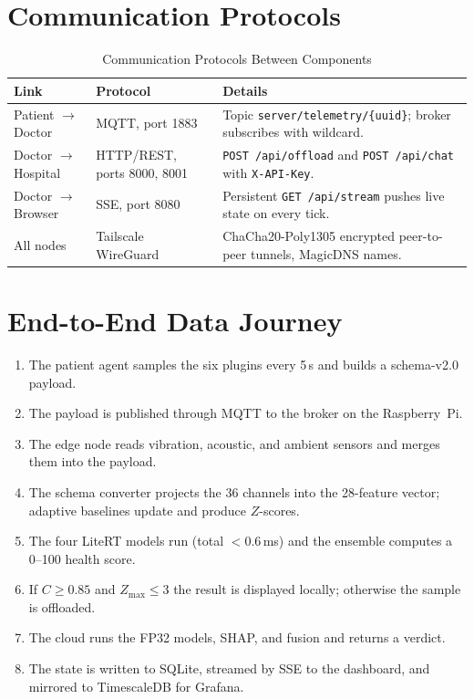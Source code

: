 \documentclass[12pt,a4paper]{report}
\begin{document}
\section{Communication Protocols}
\begin{table}[h!]
  \centering
  \caption{Communication Protocols Between Components}
  \label{tab:protocols}
  \vspace*{5pt}
  \footnotesize
  \renewcommand{\arraystretch}{1.4}
  \begin{tabular}{|p{2.6cm}|p{2.6cm}|p{8cm}|}
    \hline
    \textbf{Link} & \textbf{Protocol} & \textbf{Details} \\ \hline
    Patient $\to$ Doctor & MQTT, port 1883 & Topic \texttt{server/telemetry/\{uuid\}}; broker subscribes with wildcard. \\ \hline
    Doctor $\to$ Hospital & HTTP/REST, ports 8000, 8001 & \texttt{POST /api/offload} and \texttt{POST /api/chat} with \texttt{X-API-Key}. \\ \hline
    Doctor $\to$ Browser & SSE, port 8080 & Persistent \texttt{GET /api/stream} pushes live state on every tick. \\ \hline
    All nodes & Tailscale WireGuard & ChaCha20-Poly1305 encrypted peer-to-peer tunnels, MagicDNS names. \\ \hline
  \end{tabular}
\end{table}

\section{End-to-End Data Journey}
\begin{enumerate}
  \item The patient agent samples the six plugins every 5\,s and builds a schema-v2.0 payload.
  \item The payload is published through MQTT to the broker on the Raspberry~Pi.
  \item The edge node reads vibration, acoustic, and ambient sensors and merges them into the payload.
  \item The schema converter projects the 36 channels into the 28-feature vector; adaptive baselines update and produce $Z$-scores.
  \item The four LiteRT models run (total $<0.6$\,ms) and the ensemble computes a 0--100 health score.
  \item If $C\ge0.85$ and $Z_{\max}\le3$ the result is displayed locally; otherwise the sample is offloaded.
  \item The cloud runs the FP32 models, SHAP, and fusion and returns a verdict.
  \item The state is written to SQLite, streamed by SSE to the dashboard, and mirrored to TimescaleDB for Grafana.
\end{enumerate}
\end{document}
